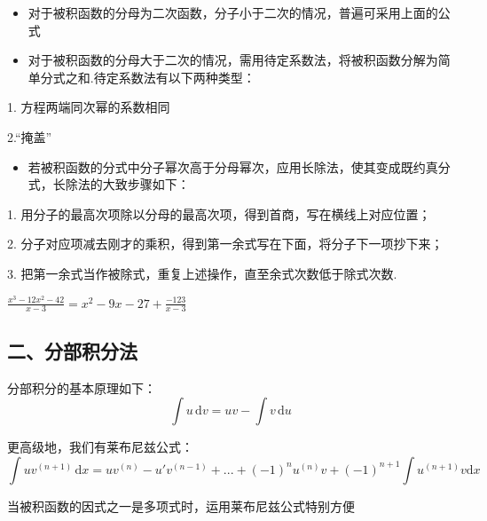 \begin{itemize}
\item 对于被积函数的分母为二次函数，分子小于二次的情况，普遍可采用上面的公式
\end{itemize}
\begin{itemize}
\item 对于被积函数的分母大于二次的情况，需用待定系数法，将被积函数分解为简单分式之和.待定系数法有以下两种类型：
\end{itemize}
1. 方程两端同次幂的系数相同

2.“掩盖”

\begin{itemize}
\item 若被积函数的分式中分子幂次高于分母幂次，应用长除法，使其变成既约真分式，长除法的大致步骤如下：
\end{itemize}

1. 用分子的最高次项除以分母的最高次项，得到首商，写在横线上对应位置；

2. 分子对应项减去刚才的乘积，得到第一余式写在下面，将分子下一项抄下来；

3. 把第一余式当作被除式，重复上述操作，直至余式次数低于除式次数.
\begin{example}{}
$\displaystyle{\frac{x^3-12x^2-42}{x-3}=x^2-9x-27+\frac{-123}{x-3}}$ 
\end{example}
\subsection{二、分部积分法}
分部积分的基本原理如下：
$$\int u\,\mathrm{d}v=uv-\int v\,\mathrm{d}u$$

更高级地，我们有莱布尼兹公式：
$$\int uv^{(n+1)}\,\mathrm{d}x=uv^{(n)}-u'v^{(n-1)}+...+(-1)^nu^{(n)}v+(-1)^{n+1}\int u^{(n+1)}v\mathrm{d}x$$

当被积函数的因式之一是多项式时，运用莱布尼兹公式特别方便

